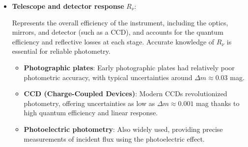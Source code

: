\begin{itemize}
\begin{minipage}{0.3\textwidth}
\begin{figure}[H]
            \caption{Profile of a photometric filter response.}
        \end{figure}
    \end{minipage}

    \item \textbf{Telescope and detector response} $R_\nu$: 
    
    Represents the overall efficiency of the instrument, including the optics, mirrors, and detector (such as a CCD), and accounts for the quantum efficiency and reflective losses at each stage. Accurate knowledge of $R_\nu$ is essential for reliable photometry.

    \begin{itemize}
        \item \textbf{Photographic plates}: Early photographic plates had relatively poor photometric accuracy, with typical uncertainties around $\Delta m \approx 0.03$ mag.
        \item \textbf{CCD (Charge-Coupled Devices)}: Modern CCDs revolutionized photometry, offering uncertainties as low as $\Delta m \approx 0.001$ mag thanks to high quantum efficiency and linear response.
        \item \textbf{Photoelectric photometry}: Also widely used, providing precise measurements of incident flux using the photoelectric effect.
    \end{itemize}
\end{itemize}

